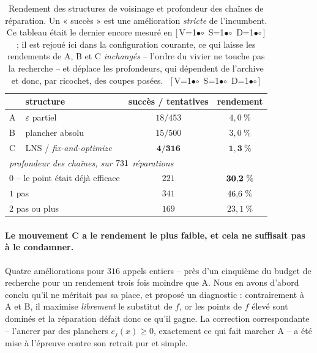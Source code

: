 \documentclass[11pt,a4paper]{article}
\theoremstyle{plain}
\theoremstyle{remark}
\newcommand{\cfgm}[1]{\ifnum#1=1$\bullet$\else$\circ$\fi}
\newcommand{\conf}[3]{%
  \textsf{\footnotesize[\,V\cfgm{#1}\ S\cfgm{#2}\ D\cfgm{#3}\,]}}
\begin{document}
\begin{table}[H]
\centering
\caption{Rendement des structures de voisinage et profondeur des chaînes de
réparation. Un « succès » est une amélioration \emph{stricte} de
l'incumbent. Ce tableau était le dernier encore mesuré en \conf{0}{1}{1} ;
il est rejoué ici dans la configuration courante, ce qui laisse les
rendements de A, B et C \emph{inchangés} -- l'ordre du vivier ne touche pas
la recherche -- et déplace les profondeurs, qui dépendent de l'archive et
donc, par ricochet, des coupes posées.\ \conf{1}{1}{1}}
\label{tab:voisinage}
\begin{tabular}{llcc}
\toprule
& structure & succès / tentatives & rendement\\
\midrule
A & $\varepsilon$ partiel        & $18/453$ & $4{,}0\ \%$\\
B & plancher absolu              & $15/500$ & $3{,}0\ \%$\\
C & LNS / \emph{fix-and-optimize} & $\mathbf{4/316}$ & $\mathbf{1{,}3\ \%}$\\
\midrule
\multicolumn{4}{l}{\emph{profondeur des chaînes, sur $731{}$ réparations}}\\
\multicolumn{2}{l}{$0$ -- le point était déjà efficace}
 & $221$ & $\mathbf{30{,}2{}\ \%}$\\
\multicolumn{2}{l}{$1$ pas} & $341$ & $46{,}6{}\ \%$\\
\multicolumn{2}{l}{$2$ pas ou plus} & $169$ & $23{,}1\ \%$\\
\bottomrule
\end{tabular}
\end{table}

\paragraph{Le mouvement C a le rendement le plus faible, et cela ne
suffisait pas à le condamner.} Quatre améliorations pour $316$ appels
entiers -- près d'un cinquième du budget de recherche pour un rendement
trois fois moindre que A. Nous en avons d'abord conclu qu'il ne méritait pas
sa place, et proposé un diagnostic : contrairement à A et B, il maximise
\emph{librement} le substitut de $f$, or les points de $f$ élevé sont
dominés et la réparation défait donc ce qu'il gagne. La correction
correspondante -- l'ancrer par des planchers $e_j(x)\ge 0$, exactement ce
qui fait marcher A -- a été mise à l'épreuve contre son retrait pur et
simple.
\end{document}
